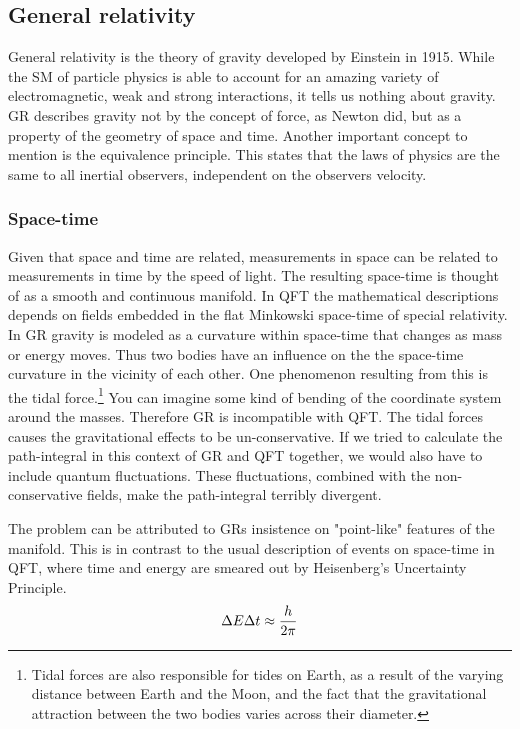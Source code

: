 \subsection{General relativity}
General relativity is the theory of gravity developed by Einstein in 1915. While the SM of particle physics is able to account for an amazing variety of electromagnetic, weak and strong interactions, it tells us nothing about gravity. GR describes gravity not by the concept of force, as Newton did, but as a property of the geometry of space and time. Another important concept to mention is the equivalence principle. This states that the laws of physics are the same to all inertial observers, independent on the observers velocity.

\subsubsection{Space-time}
Given that space and time are related, measurements in space can be related to measurements in time by the speed of light. The resulting space-time is thought of as a smooth and continuous manifold. In QFT the mathematical descriptions depends on fields embedded in the flat Minkowski space-time of special relativity. In GR gravity is modeled as a curvature within space-time that changes as mass or energy moves. Thus two bodies have an influence on the the space-time curvature in the vicinity of each other. One phenomenon resulting from this is the tidal force.\footnote{Tidal forces are also responsible for tides on Earth, as a result of the varying distance between Earth and the Moon, and the fact that the gravitational attraction between the two bodies varies across their diameter.} You can imagine some kind of bending of the coordinate system around the masses. Therefore GR is incompatible with QFT. The tidal forces causes the gravitational effects to be un-conservative. If we tried to calculate the path-integral in this context of GR and QFT together, we would also have to include quantum fluctuations. These fluctuations, combined with the non-conservative fields, make the path-integral terribly divergent.

The problem can be attributed to GRs insistence on "point-like" features of the manifold. This is in contrast to the usual description of events on space-time in QFT, where time and energy are smeared out by Heisenberg's Uncertainty Principle.
\begin{equation}
	\Delta E \Delta t \approx {h \over 2 \pi}
\end{equation}


